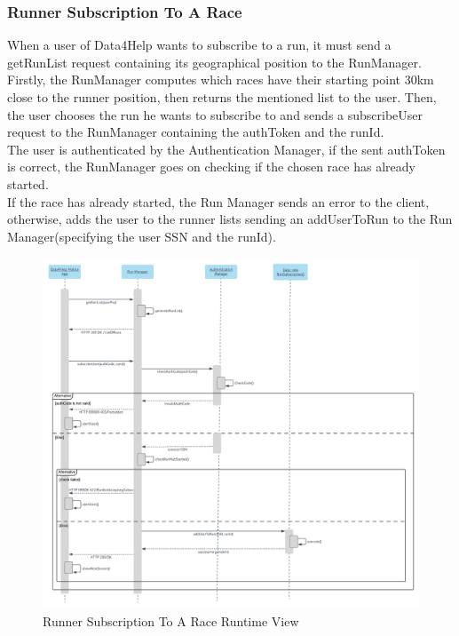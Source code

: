 \subsubsection{Runner Subscription To A Race}
When a user of Data4Help wants to subscribe to a run, it must send a getRunList request containing its geographical position to the RunManager. \\
Firstly, the RunManager computes which races have their starting point 30km close to the runner position, then returns the mentioned list to the user. 
Then, the user chooses the run he wants to subscribe to and sends a subscribeUser request to the RunManager containing the authToken and the runId. \\
The user is authenticated by the Authentication Manager, if the sent authToken is correct, the RunManager goes on checking if the chosen race has already started.\\ If the race has already started, the Run Manager sends an error to the client, otherwise, adds the user to the runner lists sending an addUserToRun to the Run Manager(specifying the user SSN and the runId).\\

\begin{figure}[H]
	\includegraphics[width=\textwidth,height=\textheight,keepaspectratio]{assets/flowCharts/RunnerSubscriptionToARace.pdf}
	\caption{Runner Subscription To A Race Runtime View}
	\label{fig:RunnerSubscriptionToARace}
\end{figure}


